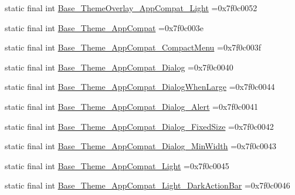 \begin{DoxyCompactItemize}
\item 
static final int \mbox{\hyperlink{classbr_1_1unb_1_1cic_1_1mp_1_1marketmaster_1_1test_1_1R_1_1style_ade92a7e43d85b60aa1474b150b733e2f}{Base\+\_\+\+Theme\+Overlay\+\_\+\+App\+Compat\+\_\+\+Light}} =0x7f0c0052
\item 
static final int \mbox{\hyperlink{classbr_1_1unb_1_1cic_1_1mp_1_1marketmaster_1_1test_1_1R_1_1style_a7ef07d78a0fb02a2b37feb8c6d15d964}{Base\+\_\+\+Theme\+\_\+\+App\+Compat}} =0x7f0c003e
\item 
static final int \mbox{\hyperlink{classbr_1_1unb_1_1cic_1_1mp_1_1marketmaster_1_1test_1_1R_1_1style_ab7857b5bd82c4e33aad124d0d1397099}{Base\+\_\+\+Theme\+\_\+\+App\+Compat\+\_\+\+Compact\+Menu}} =0x7f0c003f
\item 
static final int \mbox{\hyperlink{classbr_1_1unb_1_1cic_1_1mp_1_1marketmaster_1_1test_1_1R_1_1style_ad27a06911a782ae879c3f0de3ff6d8e2}{Base\+\_\+\+Theme\+\_\+\+App\+Compat\+\_\+\+Dialog}} =0x7f0c0040
\item 
static final int \mbox{\hyperlink{classbr_1_1unb_1_1cic_1_1mp_1_1marketmaster_1_1test_1_1R_1_1style_a8c53c9960dda997324dc759796162fcd}{Base\+\_\+\+Theme\+\_\+\+App\+Compat\+\_\+\+Dialog\+When\+Large}} =0x7f0c0044
\item 
static final int \mbox{\hyperlink{classbr_1_1unb_1_1cic_1_1mp_1_1marketmaster_1_1test_1_1R_1_1style_add8d216b7170e5b9bb657fc77626640b}{Base\+\_\+\+Theme\+\_\+\+App\+Compat\+\_\+\+Dialog\+\_\+\+Alert}} =0x7f0c0041
\item 
static final int \mbox{\hyperlink{classbr_1_1unb_1_1cic_1_1mp_1_1marketmaster_1_1test_1_1R_1_1style_a017ccaee777c2d779c2c1bb53352832d}{Base\+\_\+\+Theme\+\_\+\+App\+Compat\+\_\+\+Dialog\+\_\+\+Fixed\+Size}} =0x7f0c0042
\item 
static final int \mbox{\hyperlink{classbr_1_1unb_1_1cic_1_1mp_1_1marketmaster_1_1test_1_1R_1_1style_a0ea26edce15e8fa343210a2ff9414ede}{Base\+\_\+\+Theme\+\_\+\+App\+Compat\+\_\+\+Dialog\+\_\+\+Min\+Width}} =0x7f0c0043
\item 
static final int \mbox{\hyperlink{classbr_1_1unb_1_1cic_1_1mp_1_1marketmaster_1_1test_1_1R_1_1style_afb96df3cee362b9745d518cf15d40055}{Base\+\_\+\+Theme\+\_\+\+App\+Compat\+\_\+\+Light}} =0x7f0c0045
\item 
static final int \mbox{\hyperlink{classbr_1_1unb_1_1cic_1_1mp_1_1marketmaster_1_1test_1_1R_1_1style_a860fccd31f5d57496a26069272206687}{Base\+\_\+\+Theme\+\_\+\+App\+Compat\+\_\+\+Light\+\_\+\+Dark\+Action\+Bar}} =0x7f0c0046
\item 

\end{DoxyCompactItemize}
